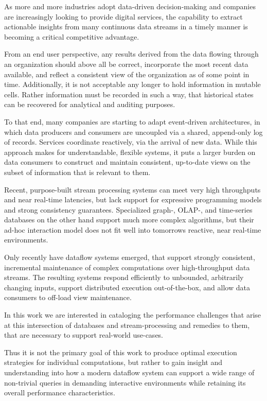 \documentclass[../index.tex]{subfiles}
\begin{document}
As more and more industries adopt data-driven decision-making and
companies are increasingly looking to provide digital services, the
capability to extract actionable insights from many continuous data
streams in a timely manner is becoming a critical competitive
advantage.

From an end user perspective, any results derived from the data
flowing through an organization should above all be correct,
incorporate the most recent data available, and reflect a consistent
view of the organization as of some point in time. Additionally, it is
not acceptable any longer to hold information in mutable cells. Rather
information must be recorded in such a way, that historical states can
be recovered for analytical and auditing purposes.

To that end, many companies are starting to adapt event-driven
architectures, in which data producers and consumers are uncoupled via
a shared, append-only log of records. Services coordinate reactively,
via the arrival of new data. While this approach makes for
understandable, flexible systems, it puts a larger burden on data
consumers to construct and maintain consistent, up-to-date views on
the subset of information that is relevant to them.

Recent, purpose-built stream processing systems can meet very high
throughputs and near real-time latencies, but lack support for
expressive programming models and strong consistency
guarantees. Specialized graph-, OLAP-, and time-series databases on
the other hand support much more complex algorithms, but their ad-hoc
interaction model does not fit well into tomorrows reactive, near
real-time environments.

Only recently have dataflow systems emerged, that support strongly
consistent, incremental maintenance of complex computations over
high-throughput data streams. The resulting systems respond
efficiently to unbounded, arbitrarily changing inputs, support
distributed execution out-of-the-box, and allow data consumers to
off-load view maintenance.

In this work we are interested in cataloging the performance
challenges that arise at this intersection of databases and
stream-processing and remedies to them, that are necessary to support
real-world use-cases. 

Thus it is not the primary goal of this work to produce optimal
execution strategies for individual computations, but rather to gain
insight and understanding into how a modern dataflow system can
support a wide range of non-trivial queries in demanding interactive
environments while retaining its overall performance characteristics.
\end{document}
